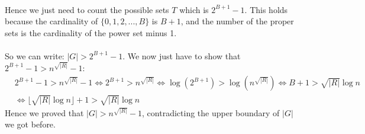 \\
Hence we just need to count the possible sets $T$ which is $2^{B+1}-1$. This holds because the cardinality of $\{0,1,2,...,B\}$ is $B+1$, and the number of the proper sets is the cardinality of the power set minus 1. \\\\
So we can write: $|G|>2^{B+1}-1$. We now just have to show that $2^{B+1}-1>n^{\sqrt{|R|}}-1$:
\begin{align*}
& 2^{B+1}-1>n^{\sqrt{|R|}}-1 \Longleftrightarrow 2^{B+1}>n^{\sqrt{|R|}} \Longleftrightarrow \log {(2^{B+1})} > \log {(n^{\sqrt{|R|}})}\Longleftrightarrow B+1 > \sqrt{|R|}\log n\\
& \Longleftrightarrow \lfloor\sqrt{|R|}\log n\rfloor+1 > \sqrt{|R|}\log n
\end{align*}
Hence we proved that $|G|>n^{\sqrt{|R|}}-1$, contradicting the upper boundary of $|G|$ we got before.
